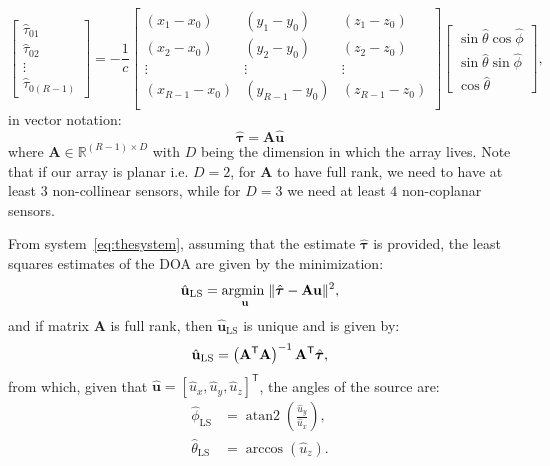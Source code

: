 \begin{equation}
\left[\begin{array}{c}
\hat{\tau}_{01} \\
\hat{\tau}_{02} \\
\vdots \\
\hat{\tau}_{0(R-1)}
\end{array}\right]
 = -\frac{1}{c} \left[\begin{array}{ccc}
(x_1-x_0) & (y_1-y_0) & (z_1-z_0) \\
(x_2-x_0) & (y_2-y_0) & (z_2-z_0) \\
\vdots & \vdots & \vdots \\
(x_{R-1}-x_0) & (y_{R-1}-y_0) & (z_{R-1}-z_0) \\
\end{array}\right] \left[\begin{array}{c}
\sin \hat{\theta} \cos \hat{\phi} \\
\sin \hat{\theta} \sin \hat{\phi} \\
\cos \hat{\theta}
\end{array}\right],
\end{equation}
in vector notation:
\begin{equation}
\hat{\boldsymbol{\tau}}=\mathbf{A}\hat{\mathbf{u}}
\label{eq:thesystem}
\end{equation}
where \(\mathbf{A}\in\mathbb{R}^{(R-1)\times D}\) with \(D\) being the dimension in which the array lives. Note that if our array is planar i.e. \(D=2\), for \(\mathbf{A}\) to have full rank, we need to have at least \(3\) non-collinear sensors, while for \(D=3\) we need at least \(4\) non-coplanar sensors.

\noindent
From system~\eqref{eq:thesystem}, assuming that the estimate \(\hat{\boldsymbol{\tau}}\) is provided, the least squares estimates of the DOA are given by the minimization:
\begin{equation}
\begin{aligned}
\hat{\mathbf{u}}_{\mathrm{LS}}
=\underset{\mathbf{u}}{\operatorname*{argmin\;}}\|\hat{\boldsymbol{\tau}}-\mathbf{A}\mathbf{u}\|^2,
\end{aligned}
\end{equation}
and if matrix \(\mathbf{A}\) is full rank, then \(\hat{\mathbf{u}}_{\mathrm{LS}}\) is unique and is given by:
\begin{equation}
\hat{\mathbf{u}}_{\mathrm{LS}}=\left({\mathbf{A}}^{\mathsf{T}} \mathbf{A}\right)^{-1} {\mathbf{A}}^{\mathsf{T}} \hat{\boldsymbol{\tau}},
\label{eq:estimate}
\end{equation}
from which, given that \(\hat{\mathbf{u}}=[\hat{u}_x,\hat{u}_y,\hat{u}_z]^\mathsf{T}\), the angles of the source are:
\begin{align}
\hat{\phi}_{\mathrm{LS}} & = \operatorname{atan2}\left(\frac{\hat{u}_y}{\hat{u}_x}\right),\\
\hat{\theta}_{\mathrm{LS}} & = \arccos\left(\hat{u}_z\right).
\end{align}

